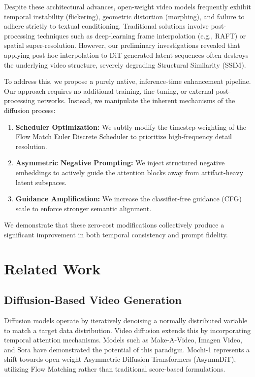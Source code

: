 \documentclass[10pt, conference]{IEEEtran}
\begin{document}
Despite these architectural advances, open-weight video models frequently exhibit temporal instability (flickering), geometric distortion (morphing), and failure to adhere strictly to textual conditioning. Traditional solutions involve post-processing techniques such as deep-learning frame interpolation (e.g., RAFT) or spatial super-resolution. However, our preliminary investigations revealed that applying post-hoc interpolation to DiT-generated latent sequences often destroys the underlying video structure, severely degrading Structural Similarity (SSIM).

To address this, we propose a purely native, inference-time enhancement pipeline. Our approach requires no additional training, fine-tuning, or external post-processing networks. Instead, we manipulate the inherent mechanisms of the diffusion process:

\begin{enumerate}
    \item \textbf{Scheduler Optimization:} We subtly modify the timestep weighting of the Flow Match Euler Discrete Scheduler to prioritize high-frequency detail resolution.
    \item \textbf{Asymmetric Negative Prompting:} We inject structured negative embeddings to actively guide the attention blocks away from artifact-heavy latent subspaces.
    \item \textbf{Guidance Amplification:} We increase the classifier-free guidance (CFG) scale to enforce stronger semantic alignment.
\end{enumerate}

We demonstrate that these zero-cost modifications collectively produce a significant improvement in both temporal consistency and prompt fidelity.

\section{Related Work}
\subsection{Diffusion-Based Video Generation}
Diffusion models operate by iteratively denoising a normally distributed variable to match a target data distribution. Video diffusion extends this by incorporating temporal attention mechanisms. Models such as Make-A-Video, Imagen Video, and Sora have demonstrated the potential of this paradigm. Mochi-1 represents a shift towards open-weight Asymmetric Diffusion Transformers (AsymmDiT), utilizing Flow Matching rather than traditional score-based formulations.
\end{document}
